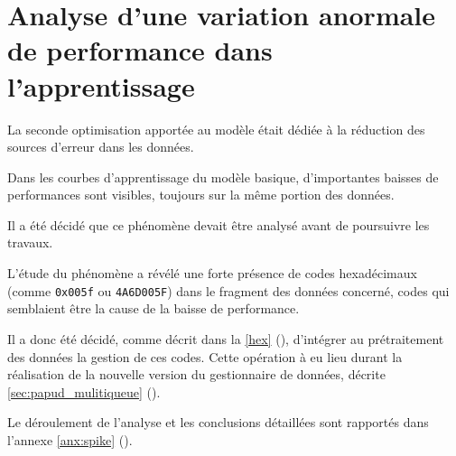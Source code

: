 \section{Analyse d'une variation anormale de performance dans l'apprentissage} \label{sec:spike}
La seconde optimisation apportée au modèle était dédiée à la réduction des sources d'erreur dans les données.

Dans les courbes d'apprentissage du modèle basique, d'importantes baisses de performances sont visibles, toujours sur la même portion des données.

Il a été décidé que ce phénomène devait être analysé avant de poursuivre les travaux.

L'étude du phénomène a révélé une forte présence de codes hexadécimaux (comme \lstinline|0x005f| ou \lstinline|4A6D005F|) dans le fragment des données concerné, codes qui semblaient être la cause de la baisse de performance.

Il a donc été décidé, comme décrit dans la \autoref{hex} (), d'intégrer au prétraitement des données la gestion de ces codes.
Cette opération à eu lieu durant la réalisation de la nouvelle version du gestionnaire de données, décrite \autoref{sec:papud_mulitiqueue} ().

Le déroulement de l'analyse et les conclusions détaillées sont rapportés dans l'annexe \ref{anx:spike} ().

